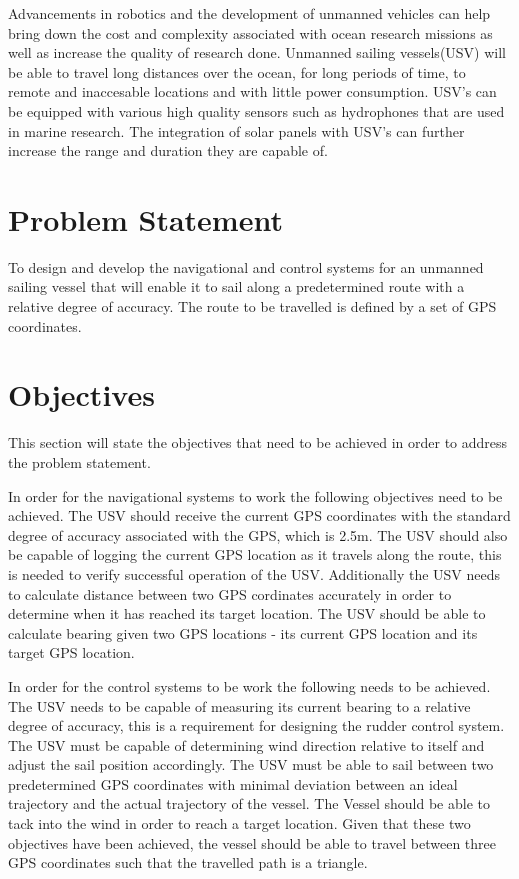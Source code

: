 Advancements in robotics and the development of unmanned vehicles can help bring down the cost and complexity associated with ocean research missions 
as well as increase the quality of research done. Unmanned sailing vessels(USV) will be able to travel long distances over the ocean, for long periods of 
time, to remote and inaccesable locations and with little power consumption. USV's can be equipped with various high quality sensors 
such as hydrophones that are used in marine research. The integration of solar panels with USV's can further increase the range and 
duration they are capable of.

\section{Problem Statement}
To design and develop the navigational and control systems for an unmanned sailing vessel that will enable it to sail along a predetermined route with a 
relative degree of accuracy. The route to be travelled is defined by a set of GPS coordinates. 

\section{Objectives}
This section will state the objectives that need to be achieved in order to address the problem statement.

In order for the navigational systems to work the following objectives need to be achieved. The USV should receive the current GPS coordinates with the 
standard degree of accuracy associated with the GPS, which is 2.5m. The USV 
should also be capable of logging the current GPS location as it travels along the route, this is needed to verify successful operation of the USV. 
Additionally the USV needs to calculate distance between two GPS cordinates accurately in order to determine when it has reached its target location. 
The USV should be able to calculate bearing given two GPS locations - its current GPS location and its target GPS location.


In order for the control systems to be work the following needs to be achieved.
The USV needs to be capable of measuring its current bearing to a relative degree of accuracy, this is a requirement for designing the rudder control system. 
The USV must be capable of determining wind direction relative to itself and adjust the sail position accordingly. 
The USV must be able to sail between two predetermined GPS coordinates with minimal deviation between an ideal trajectory and the actual trajectory of the vessel.
The Vessel should be able to tack into the wind in order to reach a target location. Given that these two objectives have been achieved, the vessel should be
able to travel between three GPS coordinates such that the travelled path is a triangle.

